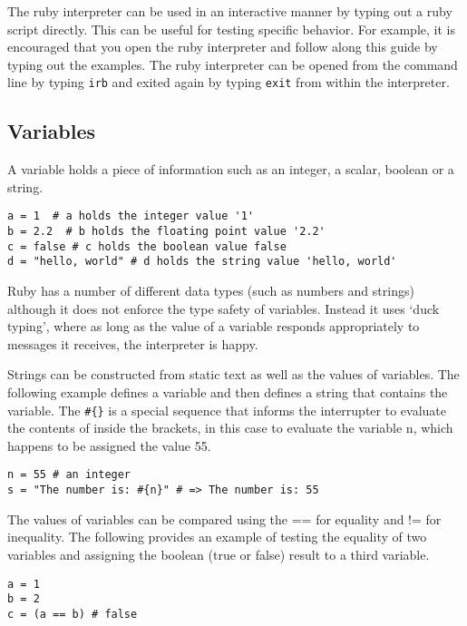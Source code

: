 \begin{bibunit}
The ruby interpreter can be used in an interactive manner by typing out a ruby script directly. This can be useful for testing specific behavior. For example, it is encouraged that you open the ruby interpreter and follow along this guide by typing out the examples. The ruby interpreter can be opened from the command line by typing \texttt{irb} and exited again by typing \texttt{exit} from within the interpreter.

\subsection{Variables}
A variable holds a piece of information such as an integer, a scalar, boolean or a string.

\begin{lstlisting}
a = 1  # a holds the integer value '1'
b = 2.2  # b holds the floating point value '2.2'
c = false # c holds the boolean value false
d = "hello, world" # d holds the string value 'hello, world'

\end{lstlisting}

Ruby has a number of different data types (such as numbers and strings) although it does not enforce the type safety of variables. Instead it uses `duck typing', where as long as the value of a variable responds appropriately to messages it receives, the interpreter is happy.

Strings can be constructed from static text as well as the values of variables. The following example defines a variable and then defines a string that contains the variable. The \texttt{\#\{\}} is a special sequence that informs the interrupter to evaluate the contents of inside the brackets, in this case to evaluate the variable n, which happens to be assigned the value 55.

\begin{lstlisting}
n = 55 # an integer 
s = "The number is: #{n}" # => The number is: 55
\end{lstlisting}

The values of variables can be compared using the == for equality and != for inequality. The following provides an example of testing the equality of two variables and assigning the boolean (true or false) result to a third variable.

\begin{lstlisting}
a = 1
b = 2
c = (a == b) # false
\end{lstlisting}


\end{bibunit}
